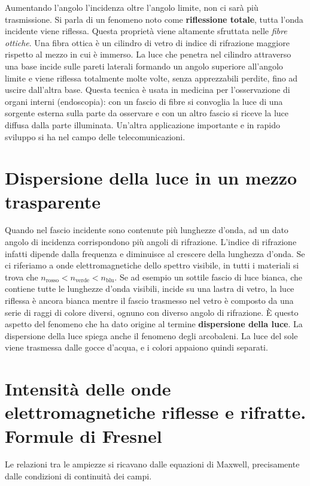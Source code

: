 Aumentando l'angolo l'incidenza oltre l'angolo limite, non ci sarà più trasmissione. Si parla di un fenomeno noto come \textbf{riflessione totale}, tutta l'onda incidente viene riflessa. Questa proprietà viene altamente sfruttata nelle \emph{fibre ottiche}. Una fibra ottica è un cilindro di vetro di indice di rifrazione maggiore rispetto al mezzo in cui è immerso. La luce che penetra nel cilindro attraverso una base incide sulle pareti laterali formando un angolo superiore all'angolo limite e viene riflessa totalmente molte volte, senza apprezzabili perdite, fino ad uscire dall'altra base. Questa tecnica è usata in medicina per l'osservazione di organi interni (endoscopia): con un fascio di fibre si convoglia la luce di una sorgente esterna sulla parte da osservare e con un altro fascio si riceve la luce diffusa dalla parte illuminata. Un'altra applicazione importante e in rapido sviluppo si ha nel campo delle telecomunicazioni.

\section{Dispersione della luce in un mezzo trasparente}

Quando nel fascio incidente sono contenute più lunghezze d'onda, ad un dato angolo di incidenza corrispondono più angoli di rifrazione. L'indice di rifrazione infatti dipende dalla frequenza e diminuisce al crescere della lunghezza d'onda. Se ci riferiamo a onde elettromagnetiche dello spettro visibile, in tutti i materiali si trova che $n_{\text{rosso}} < n_{\text{verde}} < n_{\text{blu}}$.
Se ad esempio un sottile fascio di luce bianca, che contiene tutte le lunghezze d'onda visibili, incide su una lastra di vetro, la luce riflessa è ancora bianca mentre il fascio trasmesso nel vetro è composto da una serie di raggi di colore diversi, ognuno con diverso angolo di rifrazione. È questo aspetto del fenomeno che ha dato origine al termine \textbf{dispersione della luce}.
La dispersione della luce spiega anche il fenomeno degli arcobaleni. La luce del sole viene trasmessa dalle gocce d'acqua, e i colori appaiono quindi separati.

\section{Intensità delle onde elettromagnetiche riflesse e rifratte. Formule di Fresnel}

Le relazioni tra le ampiezze si ricavano dalle equazioni di Maxwell, precisamente dalle condizioni di continuità dei campi.

